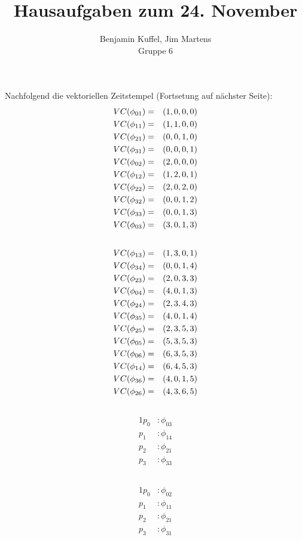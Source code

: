 \documentclass[10pt,a4paper,oneside,ngerman,numbers=noenddot]{scrartcl}
\begin{document}
\author{Benjamin Kuffel, Jim Martens\\Gruppe 6}
\title{Hausaufgaben zum 24. November}
\maketitle

\setcounter{section}{2}
\section{} %
	\subsection{}
	Nachfolgend die vektoriellen Zeitstempel (Fortsetung auf nächster Seite):
	\begin{alignat*}{2}
		VC(\phi_{01}) &=& (1,0,0,0) \\
		VC(\phi_{11}) &=& (1,1,0,0) \\
		VC(\phi_{21}) &=& (0,0,1,0) \\
		VC(\phi_{31}) &=& (0,0,0,1) \\
		VC(\phi_{02}) &=& (2,0,0,0) \\
		VC(\phi_{12}) &=& (1,2,0,1) \\
		VC(\phi_{22}) &=& (2,0,2,0) \\
		VC(\phi_{32}) &=& (0,0,1,2) \\
		VC(\phi_{33}) &=& (0,0,1,3) \\
		VC(\phi_{03}) &=& (3,0,1,3) \\
		\intertext{}
		VC(\phi_{13}) &=& (1,3,0,1) \\
		VC(\phi_{34}) &=& (0,0,1,4) \\
		VC(\phi_{23}) &=& (2,0,3,3) \\
		VC(\phi_{04}) &=& (4,0,1,3) \\
		VC(\phi_{24}) &=& (2,3,4,3) \\
		VC(\phi_{35}) &=& (4,0,1,4) \\
		VC(\phi_{25}) &=& (2,3,5,3) \\
		VC(\phi_{05}) &=& (5,3,5,3) \\
		VC(\phi_{06}) &=& (6,3,5,3) \\
		VC(\phi_{14}) &=& (6,4,5,3) \\
		VC(\phi_{36}) &=& (4,0,	1,5) \\
		VC(\phi_{26}) &=& (4,3,6,5)
	\end{alignat*}
	
	\subsection{}
	\begin{alignat*}{1}
		p_{0}&: \phi_{03}\\
		p_{1}&: \phi_{14}\\
		p_{2}&: \phi_{21}\\
		p_{3}&: \phi_{33}
	\end{alignat*}
	
	\subsection{}
	\begin{alignat*}{1}
		p_{0}&: \phi_{02}\\
		p_{1}&: \phi_{11}\\
		p_{2}&: \phi_{21}\\
		p_{3}&: \phi_{31}
	\end{alignat*}
\end{document}
